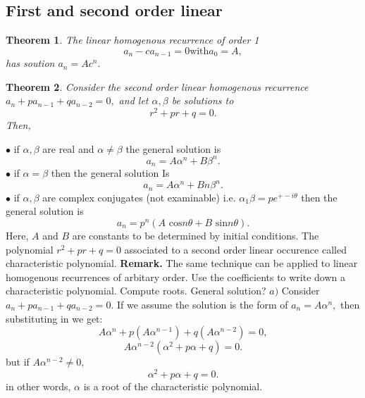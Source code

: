 \documentclass{article}
\newtheorem{theorem}{Theorem}                                       %
\begin{document}
\subsection{First and second order linear}
\begin{theorem}
  The linear homogenous recurrence of order 1
  $$a_n - ca_{n - 1} = 0 \text{with} a_0 = A,$$
  has soution $a_n = Ac^n.$
\end{theorem}
\begin{theorem}
  Consider the second order linear homogenous recurrence $a_n + pa_{n - 1} + qa_{n - 2} = 0,$ and let $\alpha, \beta$ be solutions to
  $$r^2 + pr + q = 0.$$
  Then,
\end{theorem}
$\bullet $ if $\alpha, \beta$ are real and $\alpha \not = \beta$ the general solution
is 
$$a_n = A\alpha^n + B\beta^n.$$
\newline
$\bullet $ if $\alpha = \beta$ then the general solution Is
$$a_n = A\alpha^n + Bn\beta^n.$$
\newline
$\bullet $ if $\alpha, \beta$ are complex conjugates (not examinable) i.e. $\alpha_1\beta = pe^{+- i\theta}$ then
the general solution is 
$$a_n = p^n(A\text{ cos}n\theta + B\text{ sin}n\theta).$$
Here, $A$ and $B$ are constants to be determined by initial conditions. 
\newline
\newline
The polynomial $r^2 + pr + q = 0$ associated to a second order linear occurence called characteristic polynomial.
\newline
\newline
\textbf{Remark. } The same technique can be applied to linear homogenous recurrences
of arbitary order. Use the coefficients to write down a characteristic polynomial. Compute roots.
\newline
\newline
General solution?
\newline
\newline
$a) $ Consider $a_n + pa_{n - 1} + qa_{n - 2} = 0.$
\newline
If we assume the solution is the form of $a_n = A \alpha^n,$ then substituting in we get:
$$A \alpha^n + p(A \alpha^{n - 1}) + q(A \alpha^{n - 2}) = 0,$$
$$A \alpha^{n - 2} (\alpha^2 + p\alpha + q) = 0.$$
but if $A \alpha^{n - 2} \not = 0,$
$$\alpha^2 + p\alpha + q = 0.$$
in other words, $\alpha$ is a root of the characteristic polynomial.
\newpage
\end{document}
